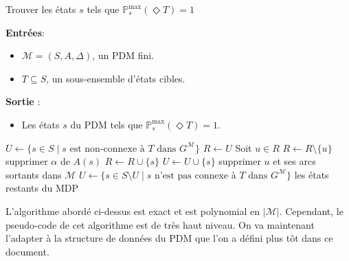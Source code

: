 \documentclass[12pt,a4paper]{report}
\theoremstyle{definition}%
\theoremstyle{remark}
\newcommand{\pr}{\mathbb{P}}
\let\labelitemi\labelitemii
\begin{document}
\begin{algorithm}[H]
\caption{Trouver les états $s$ tels que $\pr^{\max}_s(\Diamond T) = 1$}
\hspace*{\algorithmicindent} \textbf{Entrées}:
	\begin{itemize}
		\renewcommand{\labelitemi}{\tiny$\bullet$}
		\item $\mathcal{M} = (S, A, \Delta)$, un PDM fini.
		\item $T \subseteq S$, un sous-ensemble d'états cibles.
	\end{itemize}
\hspace*{\algorithmicindent} \textbf{Sortie} :
\begin{itemize}
	\renewcommand{\labelitemi}{\tiny$\bullet$}
	\item Les états $s$ du PDM tels que
		$\pr_{s}^{\max} (\Diamond T)= 1$.
\end{itemize}
\begin{algorithmic}[1]
\STATE $U \gets \{ s \in S \; | \; s \text{ est non-connexe à } T \text{ dans } G^\mathcal{M}\}$
	\STATE $R \gets U$
		\STATE Soit $u \in R$
		\STATE $R \gets R \setminus \{u \}$
			\STATE supprimer $\alpha$ de $A(s)$
				\STATE $R \gets R \cup \{s\}$
				\STATE $U \gets U \cup \{s\}$
			\ENDIF
		\ENDFOR
		\STATE supprimer $u$ et ses arcs sortants dans $\mathcal{M}$
	\ENDWHILE
	\STATE $U \gets \{ s \in S \setminus U \; | \; s \text{ n'est pas connexe à } T \text{ dans } G^\mathcal{M} \}$
\ENDWHILE
\RETURN les états restants du MDP
\end{algorithmic}
\end{algorithm}

L'algorithme abordé ci-dessus est exact et est polynomial en $|\mathcal{M}|$.
Cependant, le pseudo-code de cet algorithme est de très haut niveau. On va maintenant l'adapter à
la structure de données du PDM que l'on a défini plus tôt dans ce document.
\end{document}
